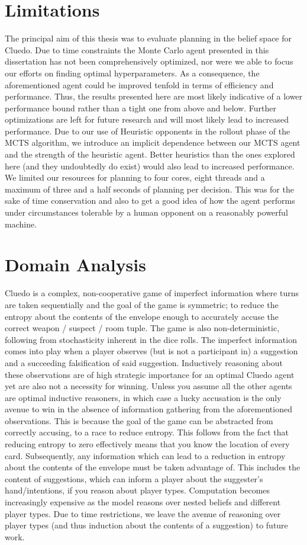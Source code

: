 \documentclass[msc, deptreport, ai, romanprepages]{infthesis}
\begin{document}
\section{Limitations}
The principal aim of this thesis was to evaluate planning in the belief space for Cluedo. Due to time constraints the Monte Carlo agent presented in this dissertation has not been comprehensively optimized, nor were we able to focus our efforts on finding optimal hyperparameters. As a consequence, the aforementioned agent could be improved tenfold in terms of efficiency and performance. Thus, the results presented here are most likely indicative of a lower performance bound rather than a tight one from above and below. Further optimizations are left for future research and will most likely lead to increased performance. Due to our use of Heuristic opponents in the rollout phase of the MCTS algorithm, we introduce an implicit dependence between our MCTS agent and the strength of the heuristic agent. Better heuristics than the ones explored here (and they undoubtedly do exist) would also lead to increased performance. We limited our resources for planning to four cores, eight threads and a maximum of three and a half seconds of planning per decision. This was for the sake of time conservation and also to get a good idea of how the agent performs under circumstances tolerable by a human opponent on a reasonably powerful machine. 

\section{Domain Analysis}
Cluedo is a complex, non-cooperative game of imperfect information where turns are taken sequentially and the goal of the game is symmetric; to reduce the entropy about the contents of the envelope enough to accurately accuse the correct weapon / suspect / room tuple. The game is also non-deterministic, following from stochasticity inherent in the dice rolls. The imperfect information comes into play when a player observes (but is not a participant in) a suggestion and a succeeding falsification of said suggestion. Inductively reasoning about these observations are of high strategic importance for an optimal Cluedo agent yet are also not a necessity for winning. Unless you assume all the other agents are optimal inductive reasoners, in which case a lucky accusation is the only avenue to win in the absence of information gathering from the aforementioned observations. This is because the goal of the game can be abstracted from correctly accusing, to a race to reduce entropy. This follows from the fact that reducing entropy to zero effectively means that you know the location of every card. Subsequently, any information which can lead to a reduction in entropy about the contents of the envelope must be taken advantage of. This includes the content of suggestions, which can inform a player about the suggester’s hand/intentions, if you reason about player types. Computation becomes increasingly expensive as the model reasons over nested beliefs and different player types. Due to time restrictions, we leave the avenue of reasoning over player types (and thus induction about the contents of a suggestion) to future work. 
\end{document}
